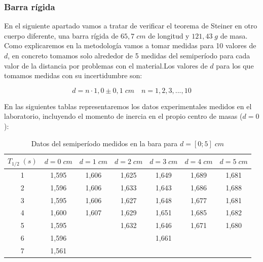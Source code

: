 \documentclass[a4paper,12pt,titlepage]{report}
\begin{document}
\subsubsection{Barra rígida}

En el siguiente apartado vamos a tratar de verificar el teorema de Steiner en otro cuerpo diferente, una barra rígida de $65,7 \; cm$ de longitud y $121,43 \; g$ de masa. Como explicaremos en la metodología vamos a tomar medidas para 10 valores de $d$, en concreto tomamos solo alrededor de 5 medidas del semiperíodo para cada valor de la distancia por problemas con el material.Los valores de $d$ para los que tomamos medidas con su incertidumbre son:

\begin{equation}
    d = n\cdot 1,0 \pm 0,1 \; cm \quad n = 1,2,3,...,10
\end{equation}

En las siguientes tablas representaremos los datos experimentales medidos en el laboratorio, incluyendo el momento de inercia en el propio centro de masas ($d=0$):

\begin{table}[h!]
    \centering
    \begin{tabular}{|c|c|c|c|c|c|c|}
    \hline
    $T_{1/2} \; (s)$ & $d=0 \;cm$& $d=1 \;cm$ & $d=2 \;cm$ & $d=3 \;cm$ & $d=4 \;cm$ & $d=5 \;cm$ \\ \hline
    1 & 1,595 & 1,606 & 1,625 & 1,649 & 1,689 & 1,681 \\ \hline
    2 & 1,596 & 1,606 & 1,633 & 1,643 & 1,686 & 1,688 \\ \hline
    3 & 1,595 & 1,606 & 1,627 & 1,648 & 1,677 & 1,681 \\ \hline
    4 & 1,600   & 1,607 & 1,629 & 1,651 & 1,685 & 1,682 \\ \hline
    5 & 1,595 &       & 1,632 & 1,646 & 1,671 & 1,680  \\ \hline
    6 & 1,596 &       &       & 1,661 &       &       \\ \hline
    7 & 1,561 &       &       &       &       &       \\ \hline
    \end{tabular}
    \caption{Datos del semiperíodo medidos en la bara para $d=[0;5] \; cm$}
    \label{Datos barra 1}
\end{table}
\end{document}
